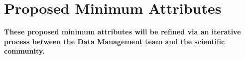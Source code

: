 \documentclass[DM,lsstdraft,toc]{lsstdoc}
\begin{document}

\clearpage
\section{Proposed Minimum Attributes}\label{sec:mvp}

\textbf{These proposed minimum attributes will be refined via an iterative process between the Data Management team and the scientific community.}
\end{document}
